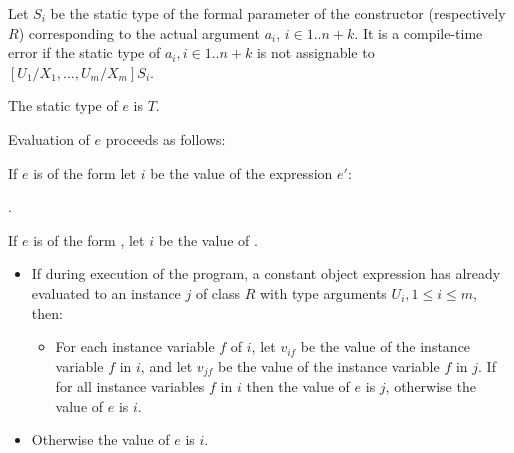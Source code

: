 \documentclass[makeidx]{article}
\begin{document}
{\LMHash{}%
Let $S_i$ be the static type of
the formal parameter of the constructor  (respectively $R$)
corresponding to the actual argument $a_i$, $i \in 1 .. n+k$.
It is a compile-time error if the static type of
$a_i, i \in 1 .. n + k$
is not assignable to $[U_1/X_1, \ldots, U_m/X_m]S_i$.

\LMHash{}%
The static type of $e$ is $T$.

\LMHash{}%
Evaluation of $e$ proceeds as follows:

\LMHash{}%
If $e$ is of the form
let $i$ be the value of the expression $e'$:

\noindent
{}.


\LMHash{}%
If $e$ is of the form
,
let $i$ be the value of
.

\LMHash{}%
\begin{itemize}
\item If during execution of the program,
  a constant object expression has already evaluated to
  an instance $j$ of class $R$ with type arguments $U_i, 1 \le i \le m$, then:
\begin{itemize}
\item For each instance variable $f$ of $i$,
  let $v_{if}$ be the value of the instance variable $f$ in $i$, and
  let $v_{jf}$ be the value of the instance variable $f$ in $j$.
  If  for all instance variables $f$ in $i$
  then the value of $e$ is $j$, otherwise the value of $e$ is $i$.
\end{itemize}
\item Otherwise the value of $e$ is $i$.
\end{itemize}

}
\end{document}

